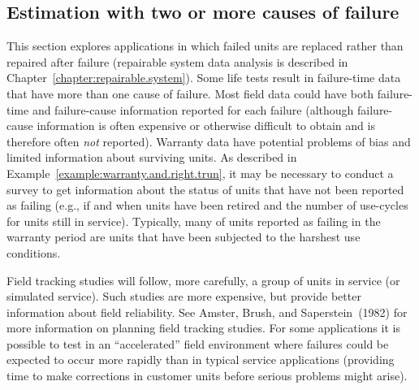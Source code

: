 \subsection{Estimation with two or more causes of failure}
\label{section:competing.risk}
This section explores applications in which failed units are
replaced rather than repaired after failure (repairable system data
analysis is described in Chapter~\ref{chapter:repairable.system}).
Some life tests result in failure-time data that have more than one
cause of failure. Most field data could have both failure-time and
failure-cause information reported for each failure (although
failure-cause information is often expensive or otherwise
difficult to obtain and is therefore often {\em not}
reported). Warranty data have potential problems of bias and limited
information about surviving units. As described in
Example~\ref{example:warranty.and.right.trun}, it may be necessary
to conduct a survey to get information about the status of units
that have not been reported as failing (e.g., if and when units have
been retired and the number of use-cycles for units still in
service).  Typically, many of units reported as failing in the
warranty period are units that have been subjected to the harshest
use conditions.

Field tracking studies will follow, more carefully, a group of units
in service (or simulated service). Such studies are more expensive,
but provide better information about field reliability. See Amster,
Brush, and Saperstein~(1982) for more information on planning field
tracking studies. For some applications it is possible to test in an
``accelerated'' field environment where failures could be expected
to occur more rapidly than in typical service applications
(providing time to make corrections in customer units before serious
problems might arise).


